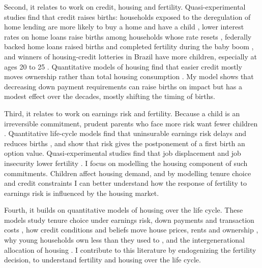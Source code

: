 Second, it relates to work on credit, housing and fertility. Quasi-experimental studies find that credit raises births: households exposed to the deregulation of home lending are more likely to buy a home and have a child \citep{hacamoBabiesMortgageDeregulation2021}, lower interest rates on home loans raise births among households whose rate resets \citep{cummingMonetaryPolicyBirth2024}, federally backed home loans raised births and completed fertility during the baby boom \citep{dettlingKearney2026}, and winners of housing-credit lotteries in Brazil have more children, especially at ages 20 to 25 \citep{vandoornikFazioRamadoraiSkrastinsHousingFertility2025}. Quantitative models of housing find that easier credit mostly moves ownership rather than total housing consumption \citep{kaplanMitmanViolanteHousing2020}. My model shows that decreasing down payment requirements can raise births on impact but has a modest effect over the decades, mostly shifting the timing of births.

Third, it relates to work on earnings risk and fertility. Because a child is an irreversible commitment, prudent parents who face more risk want fewer children \citep{fraserIncomeRisk2001}. Quantitative life-cycle models find that uninsurable earnings risk delays and reduces births \citep{sommerFertilityChoiceLife2016,ejrnaesJorgensenFamilyPlanning2020,nakakuniFertilityIncomeUncertainty2026}, and \citet{deLaCroixPommeretChildbearing2021} show that risk gives the postponement of a first birth an option value. Quasi-experimental studies find that job displacement and job insecurity lower fertility \citep{delBonoWeberWinterEbmer2012,clarkLepinteurJobInsecurity2022}. I focus on modelling the housing component of such commitments. Children affect housing demand, and by modelling tenure choice and credit constraints I can better understand how the response of fertility to earnings risk is influenced by the housing market.

Fourth, it builds on quantitative models of housing over the life cycle. These models study tenure choice under earnings risk, down payments and transaction costs \citep{fisherGervaisHomeOwnership2011,halketVasudevSaving2014,boarGoreaMidriganLiquidity2022}, how credit conditions and beliefs move house prices, rents and ownership \citep{kaplanMitmanViolanteHousing2020,greenwaldGurenCredit2025}, why young households own less than they used to \citep{fisherGervaisHomeOwnership2011,pazPardoHomeownership2024}, and the intergenerational allocation of housing \citep{coven2026}. I contribute to this literature by endogenizing the fertility decision, to understand fertility and housing over the life cycle.


